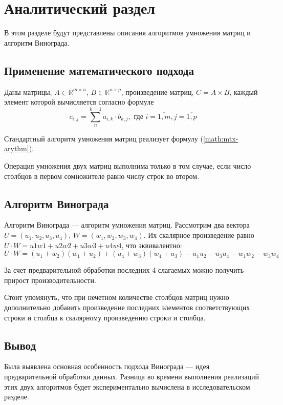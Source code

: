 \chapter{Аналитический раздел}\label{analyth}

В этом разделе будут представлены описания алгоритмов умножения матриц и алгоритм Винограда.


\section{Применение математического подхода}
Даны матрицы, $A \in \mathbb{R}^{m \times n}$, $B \in \mathbb{R}^{n \times p}$, произведение матриц, $C = A \times B$, каждый элемент которой вычисляется согласно формуле
\begin{equation}\label{math:mtx-arythm} 
	c_{i,j} = \sum_{n}^{k = 1}a_{i, k}\cdot b_{k, j}, \text{  где } i = \overline{1, m}, j = \overline{1, p} 
\end{equation}

\noindent 

Стандартный алгоритм умножения матриц реализует формулу (\ref{math:mtx-arythm}). 

Операция умножения двух матриц выполнима только в том случае, если число столбцов в первом сомножителе равно числу строк во втором.  

\section{Алгоритм Винограда}

Алгоритм Винограда \cite{YV} --- алгоритм умножения матриц.
Рассмотрим два вектора $U = (u_1, u_2, u_3, u_4)$, $W = (w_1, w_2, w_3, w_4)$. Их скалярное произведение равно $U \cdot W = u1w1 + u2w2 + u3w3 + u4w4$, что эквивалентно:
	$$
	U\cdot W = (u_1 + w_2)(w_1 + u_2) + (u_4 + w_3)(w_4 + u_3) - u_1u_2 - u_3u_4 - w_1w_2 - w_3w_4 $$
	
За счет предварительной обработки последних 4 слагаемых можно получить прирост производительности.

Стоит упомянуть, что при нечетном количестве столбцов матриц нужно дополнительно добавить произведение последних элементов соответствующих строки и столбца к скалярному произведению строки и столбца.

\section*{Вывод}
Была выявлена основная особенность подхода Винограда --- идея предварительной обработки данных. Разница во времени выполнения реализаций этих двух алгоритмов будет экспериментально вычислена в исследовательском разделе. 